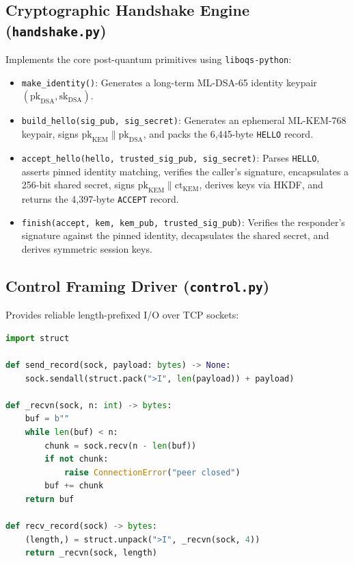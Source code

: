 \subsection{Cryptographic Handshake Engine (\texttt{handshake.py})}
Implements the core post-quantum primitives using \texttt{liboqs-python}:
\begin{itemize}
    \item \texttt{make\_identity()}: Generates a long-term ML-DSA-65 identity keypair $(\text{pk}_{\text{DSA}}, \text{sk}_{\text{DSA}})$.
    \item \texttt{build\_hello(sig\_pub, sig\_secret)}: Generates an ephemeral ML-KEM-768 keypair, signs $\text{pk}_{\text{KEM}} \parallel \text{pk}_{\text{DSA}}$, and packs the 6,445-byte \texttt{HELLO} record.
    \item \texttt{accept\_hello(hello, trusted\_sig\_pub, sig\_secret)}: Parses \texttt{HELLO}, asserts pinned identity matching, verifies the caller's signature, encapsulates a 256-bit shared secret, signs $\text{pk}_{\text{KEM}} \parallel \text{ct}_{\text{KEM}}$, derives keys via HKDF, and returns the 4,397-byte \texttt{ACCEPT} record.
    \item \texttt{finish(accept, kem, kem\_pub, trusted\_sig\_pub)}: Verifies the responder's signature against the pinned identity, decapsulates the shared secret, and derives symmetric session keys.
\end{itemize}

\subsection{Control Framing Driver (\texttt{control.py})}
Provides reliable length-prefixed I/O over TCP sockets:
\begin{lstlisting}[language=Python]
import struct

def send_record(sock, payload: bytes) -> None:
    sock.sendall(struct.pack(">I", len(payload)) + payload)

def _recvn(sock, n: int) -> bytes:
    buf = b""
    while len(buf) < n:
        chunk = sock.recv(n - len(buf))
        if not chunk:
            raise ConnectionError("peer closed")
        buf += chunk
    return buf

def recv_record(sock) -> bytes:
    (length,) = struct.unpack(">I", _recvn(sock, 4))
    return _recvn(sock, length)
\end{lstlisting}

